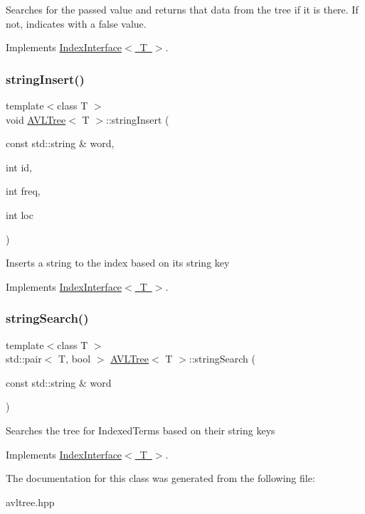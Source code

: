 Searches for the passed value and returns that data from the tree if it is there. If not, indicates with a false value. 

Implements \mbox{\hyperlink{classIndexInterface}{Index\+Interface$<$ T $>$}}.

\mbox{\label{classAVLTree_a241b96e4c35403cabdc44c4781326721}} 
\subsubsection{\texorpdfstring{string\+Insert()}{stringInsert()}}
{\footnotesize\ttfamily template$<$class T $>$ \\
void \mbox{\hyperlink{classAVLTree}{A\+V\+L\+Tree}}$<$ T $>$\+::string\+Insert (\begin{DoxyParamCaption}\item[{const std\+::string \&}]{word,  }\item[{int}]{id,  }\item[{int}]{freq,  }\item[{int}]{loc }\end{DoxyParamCaption})\hspace{0.3cm}{\ttfamily [virtual]}}

Inserts a string to the index based on its string key 

Implements \mbox{\hyperlink{classIndexInterface}{Index\+Interface$<$ T $>$}}.

\mbox{\label{classAVLTree_a2564e8382d86688fca442f3ef960612d}} 
\subsubsection{\texorpdfstring{string\+Search()}{stringSearch()}}
{\footnotesize\ttfamily template$<$class T $>$ \\
std\+::pair$<$ T, bool $>$ \mbox{\hyperlink{classAVLTree}{A\+V\+L\+Tree}}$<$ T $>$\+::string\+Search (\begin{DoxyParamCaption}\item[{const std\+::string \&}]{word }\end{DoxyParamCaption})\hspace{0.3cm}{\ttfamily [virtual]}}

Searches the tree for Indexed\+Terms based on their string keys 

Implements \mbox{\hyperlink{classIndexInterface}{Index\+Interface$<$ T $>$}}.



The documentation for this class was generated from the following file\+:\begin{DoxyCompactItemize}
\item 
avltree.\+hpp\end{DoxyCompactItemize}
